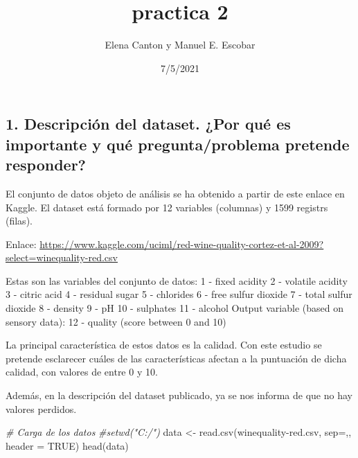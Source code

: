 \documentclass[
]{article}
\title{practica 2}
\author{Elena Canton y Manuel E. Escobar}
\date{7/5/2021}
\newenvironment{Shaded}{\begin{snugshade}}{\end{snugshade}}
\newcommand{\AttributeTok}[1]{\textcolor[rgb]{0.77,0.63,0.00}{#1}}
\newcommand{\CommentTok}[1]{\textcolor[rgb]{0.56,0.35,0.01}{\textit{#1}}}
\newcommand{\ConstantTok}[1]{\textcolor[rgb]{0.00,0.00,0.00}{#1}}
\newcommand{\FunctionTok}[1]{\textcolor[rgb]{0.00,0.00,0.00}{#1}}
\newcommand{\NormalTok}[1]{#1}
\newcommand{\OtherTok}[1]{\textcolor[rgb]{0.56,0.35,0.01}{#1}}
\newcommand{\StringTok}[1]{\textcolor[rgb]{0.31,0.60,0.02}{#1}}
\begin{document}
\maketitle

\hypertarget{descripciuxf3n-del-dataset.-por-quuxe9-es-importante-y-quuxe9-preguntaproblema-pretende-responder}{%
\subsection{1. Descripción del dataset. ¿Por qué es importante y qué
pregunta/problema pretende
responder?}\label{descripciuxf3n-del-dataset.-por-quuxe9-es-importante-y-quuxe9-preguntaproblema-pretende-responder}}

El conjunto de datos objeto de análisis se ha obtenido a partir de este
enlace en Kaggle. El dataset está formado por 12 variables (columnas) y
1599 registrs (filas).

Enlace:
\url{https://www.kaggle.com/uciml/red-wine-quality-cortez-et-al-2009?select=winequality-red.csv}

Estas son las variables del conjunto de datos: 1 - fixed acidity 2 -
volatile acidity 3 - citric acid 4 - residual sugar 5 - chlorides 6 -
free sulfur dioxide 7 - total sulfur dioxide 8 - density 9 - pH 10 -
sulphates 11 - alcohol Output variable (based on sensory data): 12 -
quality (score between 0 and 10)

La principal característica de estos datos es la calidad. Con este
estudio se pretende esclarecer cuáles de las características afectan a
la puntuación de dicha calidad, con valores de entre 0 y 10.

Además, en la descripción del dataset publicado, ya se nos informa de
que no hay valores perdidos.

\begin{Shaded}
\begin{Highlighting}[]
\CommentTok{\# Carga de los datos}
\CommentTok{\#setwd("C:/")}
\NormalTok{data }\OtherTok{\textless{}{-}} \FunctionTok{read.csv}\NormalTok{(}\StringTok{\textquotesingle{}winequality{-}red.csv\textquotesingle{}}\NormalTok{, }\AttributeTok{sep=}\StringTok{\textquotesingle{},\textquotesingle{}}\NormalTok{, }\AttributeTok{header =} \ConstantTok{TRUE}\NormalTok{)}
\FunctionTok{head}\NormalTok{(data)}
\end{Highlighting}
\end{Shaded}
\end{document}
